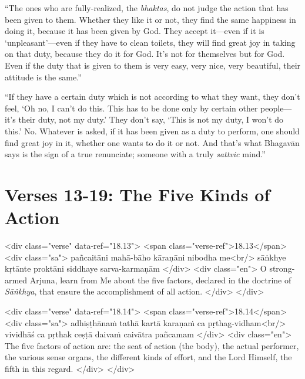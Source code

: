 \enquote{The ones who are fully-realized, the \textit{bhaktas}, do not judge the action that has been given to them. Whether they like it or not, they find the same happiness in doing it, because it has been given by God. They accept it---even if it is \enquote{unpleasant}---even if they have to clean toilets, they will find great joy in taking on that duty, because they do it for God. It’s not for themselves but for God. Even if the duty that is given to them is very easy, very nice, very beautiful, their attitude is the same.}

\enquote{If they have a certain duty which is not according to what they want, they don’t feel, \enquote{Oh no, I can’t do this. This has to be done only by certain other people---it’s their duty, not my duty.} They don’t say, \enquote{This is not my duty, I won’t do this.} No. Whatever is asked, if it has been given as a duty to perform, one should find great joy in it, whether one wants to do it or not. And that’s what Bhagavān says is the sign of a true renunciate; someone with a truly \textit{sattvic} mind.}

\section{Verses 13-19: The Five Kinds of Action}\label{sec-verses-13-19-the-five-kinds-of-action}


\begin{html}
<div class="verse" data-ref="18.13">
  <span class="verse-ref">18.13</span>
  <div class="sa">
    pañcaitāni mahā-bāho kāraṇāni nibodha me<br/>
    sāṅkhye kṛtānte proktāni siddhaye sarva-karmaṇām
  </div>
  <div class="en">
    O strong-armed Arjuna, learn from Me about the five factors, declared in the doctrine of \textit{Sāṅkhya}, that ensure the accomplishment of all action.
  </div>
</div>
\end{html}



\begin{html}
<div class="verse" data-ref="18.14">
  <span class="verse-ref">18.14</span>
  <div class="sa">
    adhiṣṭhānaṁ tathā kartā karaṇaṁ ca pṛthag-vidham<br/>
    vividhāś ca pṛthak ceṣṭā daivaṁ caivātra pañcamam
  </div>
  <div class="en">
    The five factors of action are: the seat of action (the body), the actual performer, the various sense organs, the different kinds of effort, and the Lord Himself, the fifth in this regard.
  </div>
</div>
\end{html}



